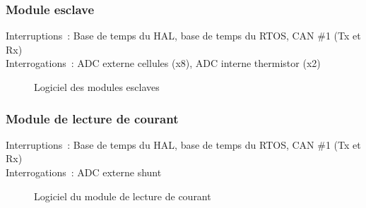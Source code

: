 	\subsubsection*{Module esclave}
		\noindent
		Interruptions : Base de temps du HAL, base de temps du RTOS, CAN \#1 (Tx et Rx) \\
		Interrogations : ADC externe cellules (x8), ADC interne thermistor (x2)
		\begin{figure}[H]
			\centering
			\caption{Logiciel des modules esclaves}
			\label{fig:logiciel_slave}
		\end{figure}
	\subsubsection*{Module de lecture de courant}
		\noindent
		Interruptions : Base de temps du HAL, base de temps du RTOS, CAN \#1 (Tx et Rx) \\
		Interrogations : ADC externe shunt
		\begin{figure}[H]
			\centering
			\caption{Logiciel du module de lecture de courant}
			\label{fig:logiciel_current_sense}
		\end{figure}
